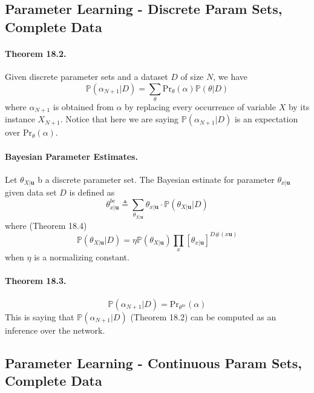 \documentclass[11pt]{article}
\newcommand{\bu}{\mathbf{u}}
\newcommand{\pr}{\mathrm{Pr}}
\begin{document}
\subsection{Parameter Learning - Discrete Param Sets, Complete Data}
\paragraph{Theorem 18.2.} Given discrete parameter sets and a dataset $D$ of size $N$, we have
\begin{equation}
	\mathbb P (\alpha _{N + 1} | D) = \sum_\theta \pr_\theta (\alpha) \mathbb P (\theta | D)
\end{equation}
where $\alpha_{N + 1}$ is obtained from $\alpha$ by replacing every occurrence of variable $X$ by its instance $X_{N+1}$. Notice that here we are saying $\mathbb P (\alpha _{N + 1} | D) $ is an expectation over $\pr_\theta (\alpha) $.

\paragraph{Bayesian Parameter Estimates.} Let $\theta_{X|\bu}$ b a discrete parameter set. The Bayesian estinate for parameter $\theta_{x | \bu}$ given data set $D$ is defined as 
\begin{equation}
	\theta_{x|\bu}^{be} \triangleq \sum_{\theta_{X| \bu}} \theta_{x | \bu} \cdot \mathbb P ( \theta_{X | \bu} | D)
\end{equation}
where (Theorem 18.4)
\begin{equation}
	\mathbb P( \theta_{X | \bu} | D) = \eta \mathbb P (\theta _{X | \bu}) \prod_x \left[ \theta_{x | \bu} \right] ^{D\# (x \bu)}
\end{equation}
when $\eta$ is a normalizing constant. 

\paragraph{Theorem 18.3.}
\begin{equation}
	\mathbb P (\alpha_{N + 1} | D ) = \pr_{\theta^{be}} (\alpha)
\end{equation}
This is saying that $\mathbb P (\alpha _{N + 1} | D)$ (Theorem 18.2) can be computed as an inference over the network. 

\subsection{Parameter Learning - Continuous Param Sets, Complete Data}
\end{document}
